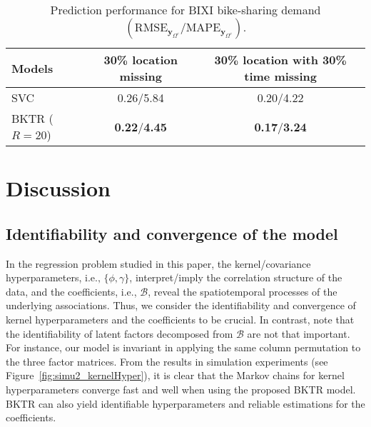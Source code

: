 \documentclass[12pt]{article}
\begin{document}
\begin{table}[!t]
\footnotesize
    \centering
    \caption{Prediction performance for BIXI bike-sharing demand $\left(\text{RMSE}_{\boldsymbol{y}_{\Omega^c}}/\text{MAPE}_{\boldsymbol{y}_{\Omega^c}}\right)$.}
    \begin{tabular}{l|cc}
    \toprule
    Models & 30\% location missing & 30\% location with 30\% time missing \\
    \midrule
    SVC & 0.26/5.84 & 0.20/4.22 \\
    BKTR ($R=20$) & \textbf{0.22}/\textbf{4.45} & \textbf{0.17}/\textbf{3.24} \\
    \bottomrule
    \end{tabular}
    \label{tab:predictionBIXI}
\end{table}





\section{Discussion}
\label{sec: discuss}


\subsection{Identifiability and convergence of the model}

In the regression problem studied in this paper, the kernel/covariance hyperparameters, $\text{i.e., }\{\phi,\gamma\}$, interpret/imply the correlation structure of the data, and the coefficients, i.e., $\boldsymbol{\mathcal{B}}$, reveal the spatiotemporal processes of the underlying associations. Thus, we consider the identifiability and convergence of kernel hyperparameters and the coefficients to be crucial. In contrast, note that the identifiability of latent factors decomposed from $\boldsymbol{\mathcal{B}}$ are not that important. For instance, our model is invariant in applying the same column permutation to the three factor matrices. From the results in simulation experiments (see Figure~\ref{fig:simu2_kernelHyper}), it is clear that the Markov chains for kernel hyperparameters converge fast and well when using the proposed BKTR model. BKTR can also yield identifiable hyperparameters and reliable estimations for the coefficients. 
\end{document}
